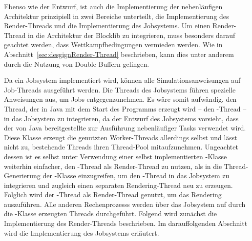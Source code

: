 Ebenso wie der Entwurf, ist auch die Implementierung der nebenläufigen Architektur prinzipiell in zwei Bereiche unterteilt, die Implementierung des Render-Threads und die Implementierung des Jobsystems. Um einen Render-Thread in die Architektur der Blocklib zu integrieren, muss besonders darauf geachtet werden, dass Wettkampfbedingungen vermieden werden. Wie in Abschnitt~\vref{sec:desgignRender-Thread} beschrieben, kann dies unter anderem durch die Nutzung von Double-Buffern gelingen. 

Da ein Jobsystem implementiert wird, können alle Simulationsanweisungen auf Job-Threads ausgeführt werden. Die Threads des Jobsystems führen spezielle Anweisungen aus, um Jobs entgegenzunehmen. Es wäre somit aufwändig, den Thread, der in Java mit dem Start des Programms erzeugt wird -- den -Thread -- in das Jobsystem zu integrieren, da der Entwurf des Jobsystems vorsieht, dass der von Java bereitgestellte \classScheduledThreadPoolExecutor{} zur Ausführung nebenläufiger Tasks verwendet wird. Diese Klasse erzeugt die genutzten Worker-Threads allerdings selbst und lässt nicht zu, bestehende Threads ihren Thread-Pool mitaufzunehmen. Ungeachtet dessen ist es selbst unter Verwendung einer selbst implementierten \classExecutor{}-Klasse weiterhin einfacher, den -Thread als Render-Thread zu nutzen, als in die Thread-Generierung der \classExecutor{}-Klasse einzugreifen, um den -Thread in das Jobsystem zu integrieren und zugleich einen separaten Rendering-Thread neu zu erzeugen. Folglich wird der -Thread als Render-Thread genutzt, um das Rendering auszuführen. Alle anderen \glspl{Rechenprozess} werden über das Jobsystem auf durch die \classExecutor{}-Klasse erzeugten Threads durchgeführt. Folgend wird zunächst die Implementierung des Render-Threads beschrieben. Im darauffolgenden Abschnitt wird die Implementierung des Jobsystems erläutert.